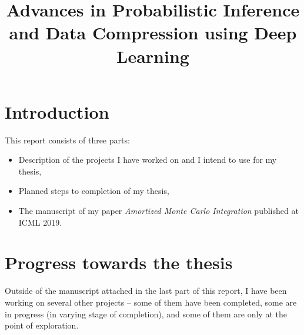 \documentclass[12pt]{article}
\begin{document}


\title{Advances in Probabilistic Inference and Data Compression using Deep Learning}
\date{}
\maketitle

\vspace{-50pt}


\section{Introduction}

This report consists of three parts:
\begin{itemize}
\item Description of the projects I have worked on and I intend to use for my thesis,
\item Planned steps to completion of my thesis,
\item The manuscript of my paper \emph{Amortized Monte Carlo Integration} published at ICML 2019.
\end{itemize}



\section{Progress towards the thesis}

Outside of the manuscript attached in the last part of this report,
I have been working on several other projects -- 
some of them have been completed, some are in progress (in varying stage of completion), 
and some of them are only at the point of exploration.
\end{document}
